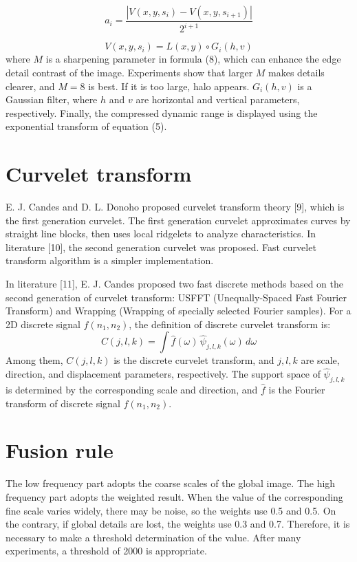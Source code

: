 \documentclass[11pt]{article}
\begin{document}
\begin{equation}
a_i=\frac{\left|V(x,y,s_i)-V(x,y,s_{i+1})\right|}{2^{i+1}}
\end{equation}

\begin{equation}
V(x,y,s_i)=L(x,y)\circ G_i(h,v)
\end{equation}
where $M$ is a sharpening parameter in formula (8), which can enhance the edge detail contrast of the image. Experiments show that larger $M$ makes details clearer, and $M=8$ is best. If it is too large, halo appears. $G_i(h,v)$ is a Gaussian filter, where $h$ and $v$ are horizontal and vertical parameters, respectively. Finally, the compressed dynamic range is displayed using the exponential transform of equation (5).

\section{Curvelet transform}

E. J. Candes and D. L. Donoho proposed curvelet transform theory [9], which is the first generation curvelet. The first generation curvelet approximates curves by straight line blocks, then uses local ridgelets to analyze characteristics. In literature [10], the second generation curvelet was proposed. Fast curvelet transform algorithm is a simpler implementation.

In literature [11], E. J. Candes proposed two fast discrete methods based on the second generation of curvelet transform: USFFT (Unequally-Spaced Fast Fourier Transform) and Wrapping (Wrapping of specially selected Fourier samples). For a 2D discrete signal $f(n_1,n_2)$, the definition of discrete curvelet transform is:
\begin{equation}
C(j,l,k)=\int \hat{f}(\omega)\,\hat{\psi}_{j,l,k}(\omega)\,d\omega
\end{equation}
Among them, $C(j,l,k)$ is the discrete curvelet transform, and $j,l,k$ are scale, direction, and displacement parameters, respectively. The support space of $\hat{\psi}_{j,l,k}$ is determined by the corresponding scale and direction, and $\hat{f}$ is the Fourier transform of discrete signal $f(n_1,n_2)$.

\section{Fusion rule}

The low frequency part adopts the coarse scales of the global image. The high frequency part adopts the weighted result. When the value of the corresponding fine scale varies widely, there may be noise, so the weights use 0.5 and 0.5. On the contrary, if global details are lost, the weights use 0.3 and 0.7. Therefore, it is necessary to make a threshold determination of the value. After many experiments, a threshold of 2000 is appropriate.
\end{document}
